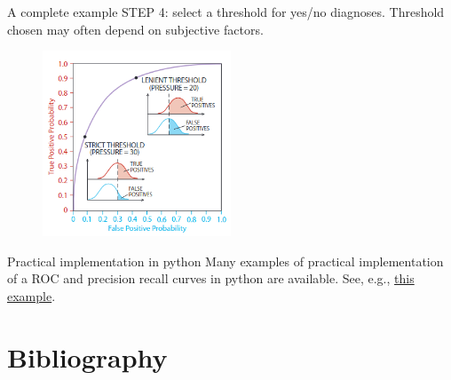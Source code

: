 \documentclass{beamer}
\begin{document}
\begin{frame}{A complete example\cite{swetsBetterDecisionsScience2000}}
  STEP 4: select a threshold for yes/no diagnoses. Threshold chosen may often depend on subjective factors.
  \begin{figure}
    \includegraphics[width=0.5\textwidth]{ROCEx4}
  \end{figure}
\end{frame}

\begin{frame}{Practical implementation in python}
  Many examples of practical implementation of a ROC and precision recall curves in python are available. See, e.g., \href{https://machinelearningmastery.com/roc-curves-and-precision-recall-curves-for-classification-in-python/}{this example}.
\end{frame}
\section{Bibliography}


\end{document}
